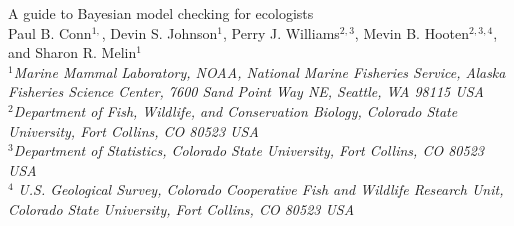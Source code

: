 \documentclass[12pt,english]{article}
\begin{document}
\begin{spacing}{1.9}


\begin{center}
  A guide to Bayesian model checking for ecologists
  \bigskip\\
  \normalsize {\sc Paul B. Conn$^{1,}$\footnotemark[5], Devin S. Johnson$^1$, Perry J. Williams$^{2,3}$, Mevin
    B. Hooten$^{2,3,4}$, and Sharon R. Melin$^1$
     }\smallskip\\
  $^1${\em Marine Mammal Laboratory, NOAA, National Marine
    Fisheries Service, Alaska Fisheries Science Center, 7600 Sand
    Point Way NE, Seattle, WA 98115 USA }\\ \medskip $^2${\em Department of Fish, Wildlife, and
    Conservation Biology, Colorado State University, Fort Collins, CO
    80523 USA } \\ \medskip  $^3${\em Department of Statistics, Colorado
    State University, Fort Collins, CO 80523 USA }\\ \medskip $^4${\em
    U.S. Geological Survey, Colorado Cooperative Fish and Wildlife
    Research Unit, Colorado State University, Fort Collins, CO 80523
    USA }\\ \medskip
\end{center}


\raggedright \setlength{\parindent}{0.3in}
{}

\linenumbers


\end{spacing}
\end{document}
